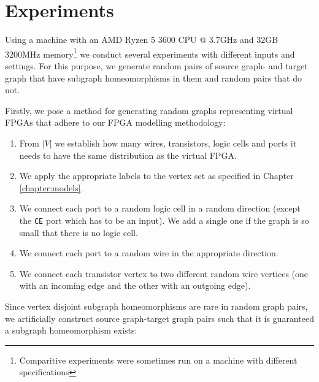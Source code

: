 \chapter{Experiments}
\label{chapter:experiments}
Using a machine with an AMD Ryzen 5 3600 CPU @ 3.7GHz and 32GB 3200MHz memory\footnote{Comparitive experiments were sometimes run on a machine with different specifications} we conduct several experiments with different inputs and settings. For this purpose, we generate random pairs of source graph- and target graph that have subgraph homeomorphisms in them and random pairs that do not.

Firstly, we pose a method for generating random graphs representing virtual FPGAs that adhere to our FPGA modelling methodology:

\begin{enumerate}
\item From $|V|$ we establish how many wires, transistors, logic cells and ports it needs to have the same distribution as the virtual FPGA.
\item We apply the appropriate labels to the vertex set as specified in Chapter \ref{chapter:models}.
\item We connect each port to a random logic cell in a random direction (except the \texttt{CE} port which has to be an input). We add a single one if the graph is so small that there is no logic cell.
\item We connect each port to a random wire in the appropriate direction.
\item We connect each transistor vertex to two different random wire vertices (one with an incoming edge and the other with an outgoing edge).
\end{enumerate}

Since vertex disjoint subgraph homeomorphisms are rare in random graph pairs, we artificially construct source graph-target graph pairs such that it is guaranteed a subgraph homeomorphism exists:

